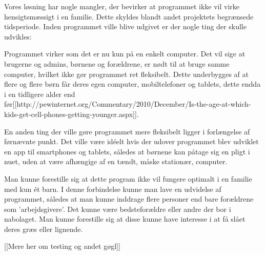 Vores løsning har nogle mangler, der bevirker at programmet ikke vil virke hensigtsmæssigt i en familie. Dette skyldes blandt andet projektets begrænsede tidsperiode. Inden programmet ville blive udgivet er der nogle ting der skulle udvikles:

Programmet virker som det er nu kun på en enkelt computer. Det vil sige at brugerne og admins, børnene og forældrene, er nødt til at bruge samme computer, hvilket ikke gør programmet ret fleksibelt. Dette underbygges af at flere og flere børn får deres egen computer, mobiltelefoner og tablets, dette endda i en tidligere alder end før[[http://pewinternet.org/Commentary/2010/December/Is-the-age-at-which-kids-get-cell-phones-getting-younger.aspx]].

En anden ting der ville gøre programmet mere fleksibelt ligger i forlængelse af førnævnte punkt. Det ville være idéelt hvis der udover programmet blev udviklet en app til smartphones og tablets, således at børnene kan påtage sig en pligt i nuet, uden at være afhængige af en tændt, måske stationær, computer.

Man kunne forestille sig at dette program ikke vil fungere optimalt i en familie med kun ét barn. I denne forbindelse kunne man lave en udvidelse af programmet, således at man kunne inddrage flere personer end bare forældrene som 'arbejdsgivere'. Det kunne være bedsteforældre eller andre der bor i nabolaget. Man kunne forestille sig at disse kunne have interesse i at få slået deres græs eller lignende.

[[Mere her om testing og andet gøgl]]

